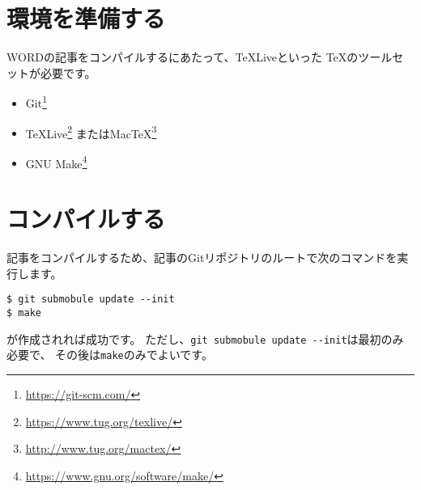 \documentclass[../../main]{subfiles}
\begin{document}
\lstset{
  basicstyle=\ttfamily,
  commentstyle=\textit,
  frame=trBL,
  numbers=left,
  breaklines=true,
  title=\lstname,
}



\renewcommand{\thelstlisting}{\arabic{lstlisting}}




\makearticletitle

\section{環境を準備する}

WORDの記事をコンパイルするにあたって、\TeX Liveといった
\TeX のツールセットが必要です。

\begin{itemize}
  \item Git\footnote{\url{https://git-scm.com/}}
  \item \TeX Live\footnote{\url{https://www.tug.org/texlive/}}
  またはMac\TeX\footnote{\url{http://www.tug.org/mactex/}}
  \item GNU Make\footnote{\url{https://www.gnu.org/software/make/}}
\end{itemize}

\section{コンパイルする}
\label{sec:compile}

記事をコンパイルするため、記事のGitリポジトリのルートで次のコマンドを実行します。

\begin{lstlisting}
$ git submobule update --init
$ make
\end{lstlisting}

が作成されれば成功です。
ただし、\lstinline|git submobule update --init|は最初のみ必要で、
その後は\lstinline|make|のみでよいです。
\end{document}
